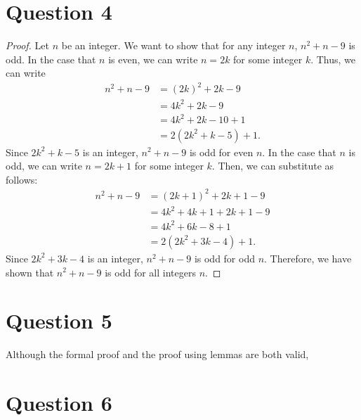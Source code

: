 \documentclass{article}
\begin{document}
\newpage
\section*{Question 4}
\begin{proof}
    Let $n$ be an integer.
    We want to show that for any integer $n$, $n^2 + n - 9$ is odd.
    In the case that $n$ is even, we can write $n = 2k$ for some integer $k$.
    Thus, we can write
    \begin{align*}
        n^2 + n - 9 &= (2k)^2 + 2k - 9 \\
        &= 4k^2 + 2k - 9 \\
        &= 4k^2 + 2k - 10 + 1 \\
        &= 2(2k^2 + k - 5) + 1.
    \end{align*}
    Since $2k^2 + k - 5$ is an integer, $n^2 + n - 9$ is odd for even $n$.
    In the case that $n$ is odd, we can write $n = 2k + 1$ for some integer $k$.
    Then, we can substitute as follows:
    \begin{align*}
        n^2 + n - 9 &= (2k + 1)^2 + 2k + 1 - 9 \\
        &= 4k^2 + 4k + 1 + 2k + 1 - 9 \\
        &= 4k^2 + 6k - 8 + 1 \\
        &= 2(2k^2 + 3k - 4) + 1.
    \end{align*}
    Since $2k^2 + 3k - 4$ is an integer, $n^2 + n - 9$ is odd for odd $n$.
    Therefore, we have shown that $n^2 + n - 9$ is odd for all integers $n$.
\end{proof}

\section*{Question 5}
Although the formal proof and the proof using lemmas are both valid, 


\section*{Question 6}
\end{document}
